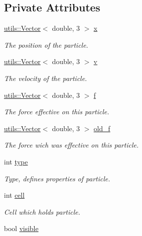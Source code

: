 \subsection*{Private Attributes}
\begin{DoxyCompactItemize}
\item 
\hyperlink{classutils_1_1Vector}{utils\-::\-Vector}$<$ double, 3 $>$ \hyperlink{classSimulation_1_1Particle_a37114cf327ef0591939f157489434bde}{x}
\begin{DoxyCompactList}\small\item\em The position of the particle. \end{DoxyCompactList}\item 
\hyperlink{classutils_1_1Vector}{utils\-::\-Vector}$<$ double, 3 $>$ \hyperlink{classSimulation_1_1Particle_aedd9ec08978292732fc38dd6d93dc3b4}{v}
\begin{DoxyCompactList}\small\item\em The velocity of the particle. \end{DoxyCompactList}\item 
\hyperlink{classutils_1_1Vector}{utils\-::\-Vector}$<$ double, 3 $>$ \hyperlink{classSimulation_1_1Particle_a54c7b7f1cb33876abdbd505d06c9b499}{f}
\begin{DoxyCompactList}\small\item\em The force effective on this particle. \end{DoxyCompactList}\item 
\hyperlink{classutils_1_1Vector}{utils\-::\-Vector}$<$ double, 3 $>$ \hyperlink{classSimulation_1_1Particle_a80cc4684069bff79cb7d91c25237141f}{old\-\_\-f}
\begin{DoxyCompactList}\small\item\em The force wich was effective on this particle. \end{DoxyCompactList}\item 
int \hyperlink{classSimulation_1_1Particle_aeb6388e2a21c03c7e1582eb4eeb5efb3}{type}
\begin{DoxyCompactList}\small\item\em Type, defines properties of particle. \end{DoxyCompactList}\item 
int \hyperlink{classSimulation_1_1Particle_aebbb649086b757029a513e09adf76d4b}{cell}
\begin{DoxyCompactList}\small\item\em Cell which holds particle. \end{DoxyCompactList}\item 
bool \hyperlink{classSimulation_1_1Particle_a20e56ab0bd4071b5cb479775742f2cfe}{visible}
\end{DoxyCompactItemize}


